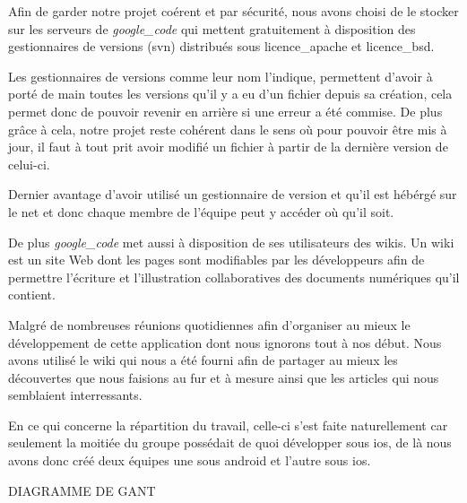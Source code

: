 		Afin de garder notre projet coérent et par sécurité, nous avons choisi de le
		stocker sur les serveurs de \emph{\gls{google_code}} qui mettent gratuitement à
		disposition des gestionnaires de versions (\gls{svn})
		distribués sous \gls{licence_apache} et \gls{licence_bsd}.
		
		Les gestionnaires de versions comme leur nom l'indique, permettent d'avoir à
		porté de main toutes les versions qu'il y a eu d'un fichier depuis sa
		création, cela permet donc de pouvoir revenir en arrière si une erreur a été commise.
		De plus grâce à cela, notre projet reste cohérent dans le sens où pour pouvoir
		être mis à jour, il faut à tout prit avoir modifié un fichier à partir de la
		dernière version de celui-ci.
		
		Dernier avantage d'avoir utilisé un gestionnaire de version et qu'il est
		hébérgé sur le net et donc chaque membre de l'équipe peut y accéder où qu'il
		soit. 
		
		De plus \emph{\gls{google_code}} met aussi à disposition de ses utilisateurs des \glspl{wiki}.
		Un \gls{wiki} est un site Web dont les pages sont modifiables par les développeurs
		afin de permettre l'écriture et l'illustration collaboratives des documents numériques qu'il contient.
		
		Malgré de nombreuses réunions quotidiennes afin d'organiser au mieux le développement de cette application dont nous ignorons
		tout à nos début. Nous avons utilisé le \gls{wiki} qui nous a été fourni afin de partager au mieux
		les découvertes que nous faisions au fur et à mesure ainsi que les articles qui nous semblaient interressants.
		
		En ce qui concerne la répartition du travail, celle-ci s'est faite naturellement car
		seulement la moitiée du groupe possédait de quoi développer sous \gls{ios}, de là nous avons
		donc créé deux équipes une sous \gls{android} et l'autre sous \gls{ios}.
		
		
		DIAGRAMME DE GANT